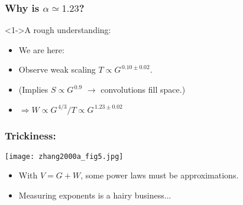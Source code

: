 \begin{frame}
  \frametitle{Why is $\alpha \simeq 1.23$?}

  \begin{block}<1->{A rough understanding:}
    \begin{itemize}
    \item<1-> 
      We are here: 
    \item<2->
      Observe weak scaling $T \propto G^{\, 0.10 \pm 0.02}$.
    \item<3->
      (Implies $S \propto G^{\, 0.9}$ $\rightarrow$ convolutions fill space.)
    \item<4->
      $\Rightarrow W \propto G^{\, 4/3}/T \propto G^{\, 1.23 \pm 0.02}$
    \end{itemize}
  \end{block}

\end{frame}

\begin{frame}
  \frametitle{Trickiness:}

  \begin{block}{}
    \begin{center}
      \texttt{[image: zhang2000a\_fig5.jpg]}
    \end{center}
  \end{block}

  \begin{block}{}
    \begin{itemize}
    \item With $V = G + W$, some power laws must be approximations.
    \item<2-> Measuring exponents is a hairy business...
    \end{itemize}
  \end{block}


\end{frame}

